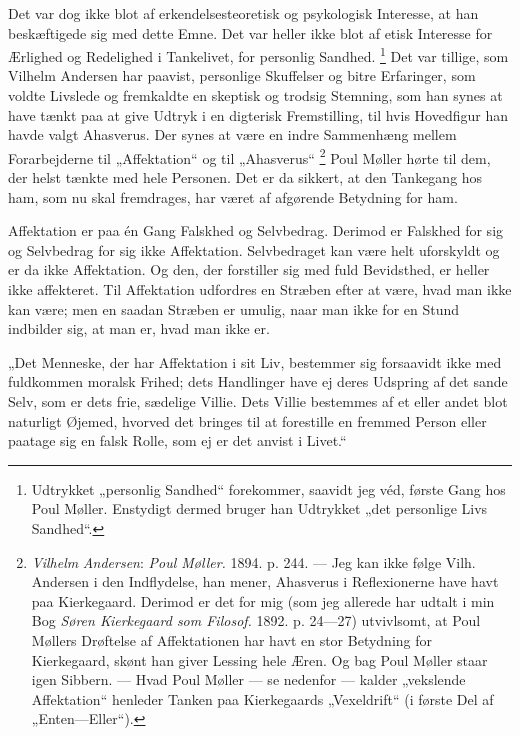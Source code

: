 \documentclass[12pt,a4paper,openany]{book}
\newcommand{\opage}[1]{\marginnote{\footnotesize\textit{[#1]}}}
\begin{document}
Det var dog ikke blot af erkendelsesteoretisk og psykologisk Interesse, at han
beskæftigede sig med dette Emne. Det var heller ikke blot af etisk Interesse
for Ærlighed og Redelighed i Tankelivet, for personlig Sandhed.%
\footnote[1]{Udtrykket „personlig Sandhed“ forekommer, saavidt jeg véd, første
Gang hos Poul Møller. Enstydigt dermed bruger han Udtrykket „det personlige
Livs Sandhed“.} Det var tillige, som Vilhelm Andersen har paavist, personlige
Skuffelser og bitre Erfaringer, som voldte Livslede og fremkaldte en skeptisk
og trodsig Stemning, som han synes at have tænkt paa at give Udtryk i en
digterisk Fremstilling, til hvis Hovedfigur han havde valgt Ahasverus. Der
synes at være en indre Sammenhæng mellem Forarbejderne til „Affektation“ og til
„Ahasverus“%
\footnote[2]{\emph{Vilhelm} \emph{Andersen}: \textit{Poul Møller.} 1894. p.
244. --- Jeg kan ikke følge Vilh. Andersen i den Indflydelse, han mener,
Ahasverus i Reflexionerne have havt paa Kierkegaard. Derimod er det for mig
(som jeg allerede har udtalt i min Bog \textit{Søren Kierkegaard som Filosof.}
1892. p. 24---27) utvivlsomt, at Poul Møllers Drøftelse af Affektationen har
havt en stor Betydning for Kierkegaard, skønt han giver Lessing hele Æren. Og
bag Poul Møller staar igen Sibbern. --- Hvad Poul Møller --- se nedenfor ---
kalder „vekslende Affektation“ henleder Tanken paa Kierkegaards „Vexeldrift“ (i
første Del af „Enten---Eller“).} Poul Møller hørte til dem, der helst tænkte
med hele Personen. Det er da sikkert, at den Tankegang hos ham, som nu skal
fremdrages, har været af afgørende Betydning for ham.

\setcounter{footnote}{0}%
\opage{124}Affektation er paa én Gang Falskhed og Selvbedrag. Derimod er
Falskhed for sig og Selvbedrag for sig ikke Affektation. Selvbedraget kan være
helt uforskyldt og er da ikke Affektation. Og den, der forstiller sig med fuld
Bevidsthed, er heller ikke affekteret. Til Affektation udfordres en Stræben
efter at være, hvad man ikke kan være; men en saadan Stræben er umulig, naar
man ikke for en Stund indbilder sig, at man er, hvad man ikke er.

„Det Menneske, der har Affektation i sit Liv, bestemmer sig forsaavidt ikke med
fuldkommen moralsk Frihed; dets Handlinger have ej deres Udspring af det sande
Selv, som er dets frie, sædelige Villie. Dets Villie bestemmes af et eller
andet blot naturligt Øjemed, hvorved det bringes til at forestille en fremmed
Person eller paatage sig en falsk Rolle, som ej er det anvist i Livet.“
\end{document}
